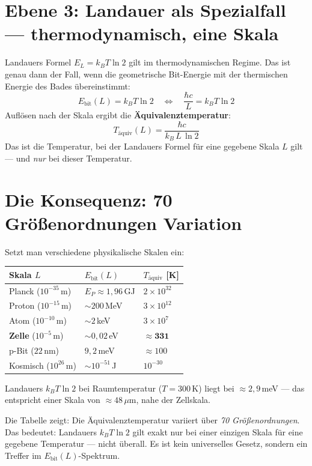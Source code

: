 \section{Ebene 3: Landauer als Spezialfall --- thermodynamisch, eine Skala}

Landauers Formel $E_L = k_BT\ln 2$ gilt im thermodynamischen Regime.
Das ist genau dann der Fall, wenn die geometrische Bit-Energie mit
der thermischen Energie des Bades übereinstimmt:
\[
  E_\text{bit}(L) = k_BT\ln 2
  \quad\Longleftrightarrow\quad
  \frac{\hbar c}{L} = k_BT\ln 2
\]
Auflösen nach der Skala ergibt die \textbf{Äquivalenztemperatur}:
\[
  T_\text{äquiv}(L) = \frac{\hbar c}{k_B \, L \, \ln 2}
\]
Das ist die Temperatur, bei der Landauers Formel für eine gegebene Skala $L$
gilt --- und \emph{nur} bei dieser Temperatur. 

\section{Die Konsequenz: 70 Größenordnungen Variation}

Setzt man verschiedene physikalische Skalen ein:

\begin{center}
\begingroup\small
\begin{tabular}{@{}p{2.5cm}p{2.5cm}p{3.0cm}@{}}
\toprule
Skala $L$ & $E_\text{bit}(L)$ & $T_\text{äquiv}$ [K] \\
\midrule
Planck ($10^{-35}$\,m) & $E_P \approx 1{,}96$\,GJ & $2 \times 10^{32}$ \\
Proton ($10^{-15}$\,m) & $\sim 200$\,MeV & $3 \times 10^{12}$ \\
Atom ($10^{-10}$\,m) & $\sim 2$\,keV & $3 \times 10^{7}$ \\
\textbf{Zelle} ($10^{-5}$\,m) & $\sim 0{,}02$\,eV & $\mathbf{\approx 331}$ \\
p-Bit ($22$\,nm) & $9{,}2$\,meV & $\approx 100$ \\
Kosmisch ($10^{26}$\,m) & $\sim 10^{-51}$\,J & $10^{-30}$ \\
\bottomrule
\end{tabular}
\endgroup
\end{center}

Landauers $k_BT\ln 2$ bei Raumtemperatur ($T = 300$\,K) liegt bei
${\approx}2{,}9$\,meV --- das entspricht einer Skala von ${\approx}48\,\mu$m,
nahe der Zellskala. 

\begin{laierspur}
Die Tabelle zeigt: Die Äquivalenztemperatur variiert über \emph{70 Größenordnungen}.
Das bedeutet: Landauers $k_BT\ln 2$ gilt exakt nur bei einer einzigen Skala
für eine gegebene Temperatur --- nicht überall. Es ist kein universelles Gesetz,
sondern ein Treffer im $E_\text{bit}(L)$-Spektrum.
\end{laierspur}

